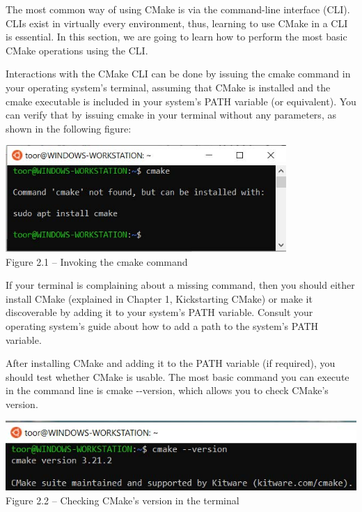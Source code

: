 
The most common way of using CMake is via the command-line interface (CLI). CLIs exist in virtually every environment, thus, learning to use CMake in a CLI is essential. In this section, we are going to learn how to perform the most basic CMake operations using the CLI.

Interactions with the CMake CLI can be done by issuing the cmake command in your operating system's terminal, assuming that CMake is installed and the cmake executable is included in your system's PATH variable (or equivalent). You can verify that by issuing cmake in your terminal without any parameters, as shown in the following figure:

\begin{center}
\includegraphics[width=0.8\textwidth]{content/1/chapter2/images/1.jpg}\\
Figure 2.1 – Invoking the cmake command
\end{center}

If your terminal is complaining about a missing command, then you should either install CMake (explained in Chapter 1, Kickstarting CMake) or make it discoverable by adding it to your system's PATH variable. Consult your operating system's guide about how to add a path to the system's PATH variable.

After installing CMake and adding it to the PATH variable (if required), you should test whether CMake is usable. The most basic command you can execute in the command line is cmake -{}-version, which allows you to check CMake's version.

\begin{center}
\includegraphics[width=1.\textwidth]{content/1/chapter2/images/2.jpg}\\
Figure 2.2 – Checking CMake's version in the terminal
\end{center}

